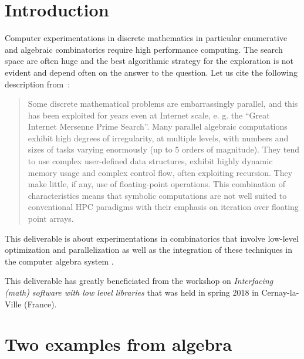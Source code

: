 \documentclass{deliverablereport}
\author{V. Delecroix, F. Hivert}
\begin{document}
\maketitle

\tableofcontents


\section{Introduction}

Computer experimentations in discrete mathematics in particular
enumerative and algebraic combinatorics require high performance
computing. The search space are often huge and the best algorithmic
strategy for the exploration is not evident and depend often on
the answer to the question. Let us cite the following description
from~\cite{LoidlTrinder-Hecke}:
\begin{quote}{}
  Some discrete mathematical problems are embarrassingly parallel, and this
  has been exploited for years even at Internet scale, e. g. the “Great
  Internet Mersenne Prime Search”.  Many parallel algebraic computations
  exhibit high degrees of irregularity, at multiple levels, with numbers and
  sizes of tasks varying enormously (up to 5 orders of magnitude). They tend
  to use complex user-defined data structures, exhibit highly dynamic memory
  usage and complex control flow, often exploiting recursion. They make
  little, if any, use of floating-point operations.  This combination of
  characteristics means that symbolic computations are not well suited to
  conventional HPC paradigms with their emphasis on iteration over floating
  point arrays.
\end{quote}

This deliverable is about experimentations in combinatorics
that involve low-level optimization and parallelization as
well as the integration of these techniques in the computer
algebra system \Sage.

This deliverable has greatly beneficiated from the \ODK workshop
on \textit{Interfacing (math) software with low level libraries}
that was held in spring 2018 in Cernay-la-Ville (France).


\section{Two examples from algebra}
\end{document}
